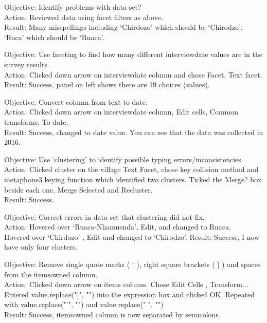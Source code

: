 \documentclass{article}
\begin{document}
Objective: Identify problems with data set?\\
Action: Reviewed data using facet filters as above.\\
Result: Many misspellings including ‘Chirdozo’ which should be ‘Chirodzo’, ‘Ruca’ which should be ‘Ruaca’. \newline

Objective: Use faceting to find how many different interview\textunderscore date values are in the survey results.\\
Action: Clicked down arrow on interview\textunderscore date column and chose Facet, Text facet.\\
Result: Success, panel on left shows there are 19 choices (values).\newline

Objective: Convert column from text to date.\\
Action: Clicked down arrow on interview\textunderscore date column, Edit cells, Common transforms, To date.\\
Result: Success, changed to date value. You can see that the data was collected in 2016.\newline

Objective: Use ‘clustering’ to identify possible typing errors/inconsistencies. \\
Action: Clicked cluster on the village Text Facet, chose key collision method and metaphone3 keying function which identified two clusters. Ticked the Merge? box beside each one, Merge Selected and Recluster.\\
Result: Success. \newline

Objective: Correct errors in data set that clustering did not fix.\\
Action: Hovered over ‘Ruaca-Nhamuenda’,  Edit, and changed to Ruaca.\\ Hovered over ‘Chirdozo’ , Edit and changed to ‘Chirodzo’. 
Result: Success, I now have only four clusters. \newline

Objective: Remove single quote marks ( ‘ ), right square brackets ( ] ) and spaces from the items\textunderscore owned column.\\
Action: Clicked down arrow on items \textunderscoreowned column. Chose Edit Cells ,  Transform... Entered value.replace("]", "")  into the expression box and clicked OK. Repeated with value.replace("’", "")  and value.replace(" ", "") \\
Result: Success, items\textunderscore owned column is now separated by semicolons.\newline
  
\end{document}
